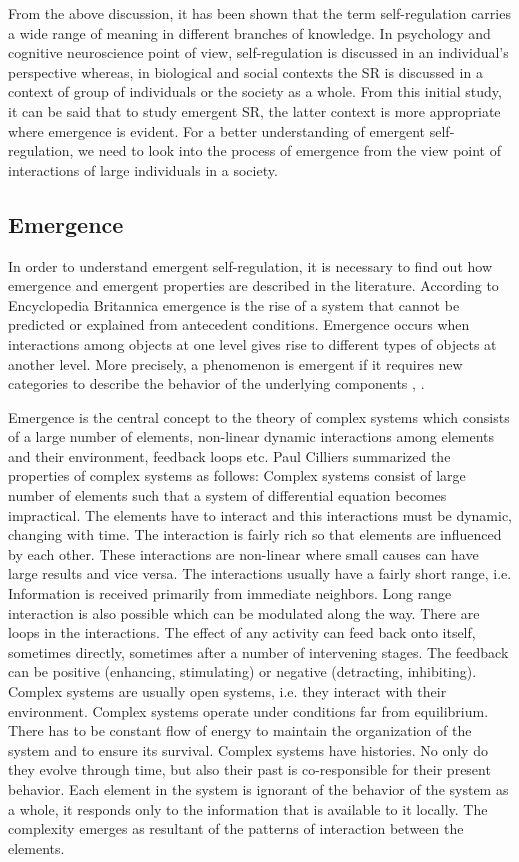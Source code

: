 From the above discussion, it has been shown that the term self-regulation carries a  wide range of meaning in different branches of knowledge. In psychology and cognitive neuroscience point of view, self-regulation is discussed in an individual's perspective whereas, in biological and social contexts the SR is discussed in a context of group of individuals or the society as a whole.  From this initial study, it can be said that  to study emergent SR,  the latter context is more appropriate where emergence is evident.  For a better understanding of emergent self-regulation, we need to look into the process of emergence from the view point of interactions of large individuals in a society.  

\subsection{Emergence}
In order to understand emergent self-regulation, it is necessary to find out how emergence and emergent properties are described in the literature. According to Encyclopedia Britannica emergence is the rise of a system that cannot be predicted or explained from antecedent conditions. Emergence occurs when interactions among objects at one level gives rise to different types of objects at another level. More precisely, a phenomenon is emergent if it requires new categories to describe the behavior of the underlying components \cite{Andriani+2004}, \cite{Kppers+1990}. 

Emergence is the central concept to the theory of complex systems which consists of a large number of elements, non-linear dynamic interactions among elements and their environment, feedback loops etc. Paul Cilliers \cite{Andriani+2004} summarized the properties of  complex systems as follows:
Complex systems consist of large number of elements such that a system of differential equation becomes impractical.
The elements have to interact and this interactions must be dynamic, changing with time. 
The interaction is fairly rich so that elements are influenced by each other. These interactions are non-linear where small causes can have large results and vice versa.
The interactions usually have a fairly short range, i.e. Information is received primarily from immediate neighbors. Long range interaction is also possible which can be modulated along the way.
There are loops in the interactions. The effect of any activity can feed back onto itself, sometimes directly, sometimes after a number of intervening stages. The feedback can be positive (enhancing, stimulating) or negative (detracting, inhibiting).
Complex systems are usually open systems, i.e. they interact with their environment.
Complex systems operate under conditions far from equilibrium. There has to be constant flow of  energy to maintain the organization of the system and to ensure its survival.
Complex systems have histories. No only do they evolve through time, but also their past is co-responsible for their present behavior.
Each element in the system is ignorant of the behavior of the system as a whole, it responds only to the information that is available to it locally. The complexity emerges as resultant of the patterns of interaction between the elements.


